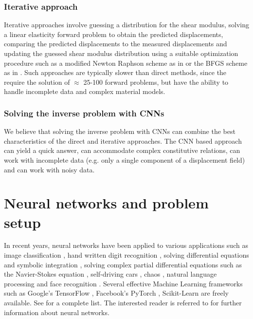 \documentclass[12pt]{article}
\begin{document}
\subsubsection{Iterative approach} Iterative approaches \cite{paper:oberai2003,paper:gokhale2008,paper:kalle1996,paper:doyley,paper:goenezen2011} involve guessing a distribution for the shear modulus, solving a linear elasticity forward problem to obtain the predicted displacements, comparing the predicted displacements to the measured displacements and updating the guessed shear modulus distribution using a suitable optimization procedure such as a modified Newton Raphson scheme as in \cite{paper:doyley} or the BFGS scheme as in \cite{paper:gokhale2008,paper:goenezen2011}. Such approaches are typically slower than direct methods, since the require the solution of $\approx$ 25-100 forward problems, but have the ability to handle incomplete data and complex material models.
\subsubsection{Solving the inverse problem with CNNs}
We believe that solving the inverse problem with CNNs can combine the best characteristics of the direct and iterative approaches. The CNN based approach can yield a quick answer, can accommodate complex constitutive relations, can work with incomplete data (e.g. only a single component of a displacement field) and can work with noisy data.
\section{Neural networks and problem setup}
In recent years, neural networks have been applied to various applications such as image classification \cite{paper:hinton2017}, hand written digit recognition \cite{paper:kulkarni2018}, solving differential equations and symbolic integration \cite{misc:lample2019}, solving complex partial differential equations such as the Navier-Stokes equation \cite{misc:anandkumar2020}, self-driving cars \cite{misc:agnihotri2019,misc:nvidiaselfdriving2016}, chaos \cite{paper:pathak2018}, natural language processing \cite{misc:googlenlp} and face recognition \cite{conf:taigman2014}. Several effective Machine Learning frameworks such as Google's TensorFlow \cite{misc:tensorflow}, Facebook's PyTorch \cite{incollect:pytorch}, Scikit-Learn \cite{paper:scikit-learn} are freely available. See \cite{misc:compdeep} for a complete list. The interested reader is referred to \cite{book:aggarwal,book:goodfellow,book:chollet,misc:cs231n,misc:andrewng,misc:udemy} for further information about neural networks.
\end{document}
